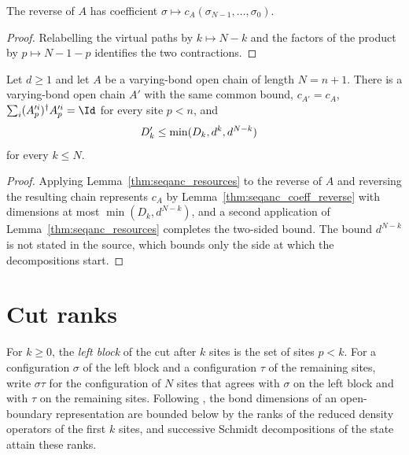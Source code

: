 \begin{lemma}
    \label{thm:seqanc_coeff_reverse}
    \leanok
    The reverse of $A$ has coefficient
    $\sigma\mapsto c_A(\sigma_{N-1},\dots,\sigma_0)$.
\end{lemma}
\begin{proof}
    \leanok
    Relabelling the virtual paths by $k\mapsto N-k$ and the factors of the product by
    $p\mapsto N-1-p$ identifies the two contractions.
\end{proof}

\begin{lemma}
    \label{thm:seqanc_resources_two_sided}
    \leanok
    Let $d\ge 1$ and let $A$ be a varying-bond open chain of length $N=n+1$.
    There is a varying-bond open chain $A'$ with the same common bound,
    $c_{A'}=c_A$, $\sum_i(A'^i_p)^\dagger A'^i_p=\Id$ for every site $p<n$, and
    \begin{align}
        D'_k & \le\min(D_k,d^k,d^{N-k})
        \notag
    \end{align}
    for every $k\le N$.
\end{lemma}
\begin{proof}
    \leanok
    Applying Lemma~\ref{thm:seqanc_resources} to the reverse of $A$ and reversing
    the resulting chain represents
    $c_A$ by Lemma~\ref{thm:seqanc_coeff_reverse} with dimensions at most $\min(D_k,d^{N-k})$, and a second application of
    Lemma~\ref{thm:seqanc_resources} completes the two-sided bound. The bound $d^{N-k}$ is not
    stated in the source, which bounds only the side at which the
    decompositions start.
\end{proof}

\section{Cut ranks}
\label{sec:seqanc_cut_ranks}

For $k\ge 0$, the \emph{left block} of the cut after $k$ sites is the set of
sites $p<k$. For a configuration $\sigma$ of the left block and a configuration
$\tau$ of the remaining sites, write $\sigma\tau$ for the configuration of $N$
sites that agrees with $\sigma$ on the left block and with $\tau$ on the
remaining sites. Following
\cite[Section~3.1]{PerezGarcia2007Matrix}, the bond dimensions of an
open-boundary representation are bounded below by the ranks of the reduced
density operators of the first $k$ sites, and successive Schmidt decompositions
of the state attain these ranks.

